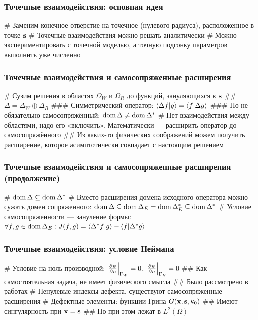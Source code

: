 \documentclass{beamer}
\begin{document}
\begin{frame}[fragile]
\frametitle{Точечные взаимодействия: основная идея}
\begin{easylist}[itemize]
# Заменим конечное отверстие на точечное (нулевого радиуса), расположенное в точке $\vb{s}$
# Точечные взаимодействия можно решать аналитически
# Можно экспериментировать с точечной моделью, а точную подгонку параметров выполнить уже численно
\end{easylist}
\end{frame}

\begin{frame}[fragile]
\frametitle{Точечные взаимодействия и самосопряженные расширения}
\begin{easylist}[itemize]
# Сузим решения в областях $\Omega_W$ и $\Omega_R$ до функций, зануляющихся в $\vb{s}$
## $\Delta = \Delta_W \oplus \Delta_R$
### Симметрический оператор: $\ip{\Delta f}{g} = \ip{f}{\Delta g}$
### Но не обязательно самосопряжённый: $\operatorname{dom}{\Delta} \ne \operatorname{dom}{\Delta^*}$
# Нет взаимодействия между областями, надо его «включить». Математически — расширить оператор до самосопряжённого
## Из каких-то физических соображений можем получить расширение, которое асимптотически совпадает с настоящим решением
\end{easylist}
\end{frame}

\begin{frame}[fragile]
\frametitle{Точечные взаимодействия и самосопряженные расширения (продолжение)}
\begin{easylist}[itemize]
# $\operatorname{dom}{\Delta} \subseteq \operatorname{dom}{\Delta^*}$
# Вместо расширения домена исходного оператора можно сужать домен сопряженного: $\operatorname{dom}{\Delta} \subseteq \operatorname{dom}{\Delta_E} = \operatorname{dom}{\Delta_E^*} \subseteq \operatorname{dom}{\Delta^*}$
# Условие самосопряженности — зануление формы: $\forall f, g \in \dom{\Delta_E}: J(f, g) = \ip{\Delta^* f}{g} - \ip{f}{\Delta^* g}$
\end{easylist}
\end{frame}



\begin{frame}[fragile]
\frametitle{Точечные взаимодействия: условие Неймана}
\begin{easylist}[itemize]
# Условие на ноль производной: $\eval{\pdv{\psi}{n}}_{\Gamma_W} = 0$, $\eval{\pdv{\psi}{n}}_{\Gamma_R} = 0$
## Как самостоятельная задача, не имеет физического смысла
## Было рассмотрено в работах 
# Ненулевые индексы дефекта, существуют самосопряженные расширения
# Дефектные элементы: функции Грина $G(\vb{x}, \vb{s}, k_0)$
## Имеют сингулярность при $\vb{x} = \vb{s}$
## Но при этом лежат в $L^2(\Omega)$
\end{easylist}
\end{frame}
\end{document}
